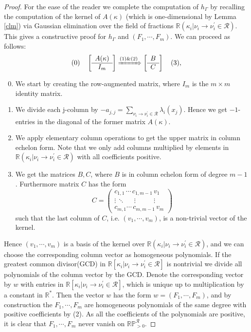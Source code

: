 \documentclass{amsart}
\theoremstyle{definition}
\theoremstyle{remark}
\theoremstyle{Conjecture/open problem}
\theoremstyle{assumption}
\theoremstyle{conjecture}
\def\la{\lambda}
\def\Pr{\mathbb{P}}
\def\Ga{\Gamma}
\def\la{\lambda}
\def\p{^{\prime}}
\def\k{\kappa}
\def\cR{\mathcal{R}}
\def\R{\mathbb{R}}
\numberwithin{equation}{section}
\begin{document}
\begin{proof}
For the ease of the reader we complete the computation of $h_\Ga$ by recalling the computation of the kernel of $A(\k)$ (which is one-dimensional by Lemma \ref{clm}) via Gaussian elimination over the field of fractions $\R(\k_i|{\nu_i\to\nu_i\p}\in\cR)$. This gives a constructive proof for $h_\Ga$ and $(F_1,\cdots,F_m)$. We can proceed as follows:
$$(0)\quad \left[
    	\begin{array}{cc|cc}
    	A(\k) \\
    	\hline
    	I_m \\	
    	\end{array}
    	\right]\xRightarrow{(1)\&(2)}
	\left[
    	\begin{array}{cc|cc}
    	B \\
    	\hline
    	C \\	
    	\end{array}
    	\right]\quad (3),	$$


\begin{enumerate}
\setcounter{enumi}{-1}
\item We start by creating the row-augmented matrix, where $I_m$ is the $m\times m$ identity matrix.
\item We divide each j-column by $-a_{j,j}=\sum_{\nu_i\to\nu_i\p\in\cR}\la_i(x_j)$. Hence we get $-1$-entries in the diagonal of the former matrix $A(\k)$. 
\item We apply elementary column operations to get the upper matrix in column echelon form. Note that we only add columns multiplied by elements in $\R(\k_i|{\nu_i\to\nu_i\p}\in\cR)$ with all coefficients positive.
\item We get the matrices $B,C$, where $B$ is in column echelon form of degree $m-1$. Furthermore  matrix $C$ has the form $$C=\begin{pmatrix}
c_{1,1}\,\cdots\, c_{1,m-1}\, v_1\\
\vdots\,\ddots\,\quad\,\vdots\,\,\,\,\,\,\,\,\,\,\,\,\,\,\,\,\vdots\\
c_{m,1}\cdots\, c_{m,m-1}\, v_m
\end{pmatrix}$$
	such that the last column of $C$, i.e. $(v_1,\cdots, v_m)$, is a non-trivial vector of the kernel.
\end{enumerate}
Hence $(v_1,\cdots, v_m)$ is a basis of the kernel over $\R(\k_i|{\nu_i\to\nu_i\p}\in\cR)$, and we can choose the corresponding column vector as homogeneous polynomials. If the greatest common divisor(GCD) in $\R[\k_i|{\nu_i\to\nu_i\p}\in\cR]$ is nontrivial we divide all polynomials of the column vector by the GCD. Denote the corresponding vector by $w$ with entries in $\R[\k_i|{\nu_i\to\nu_i\p}\in\cR]$, which is unique up to multiplication by a constant in $\R^*$.
 Then the vector $w$ has the form $w=(F_1,\cdots ,F_m)$, and by construction the $F_1,\cdots ,F_m$ are homogeneous polynomials of the same degree with positive coefficients by (2). As all the coefficients of the polynomials are positive, it is clear that $F_1,\cdots, F_m$ never vanish on $\R\Pr_{>0}^\cR$.
\end{proof}
\end{document}
